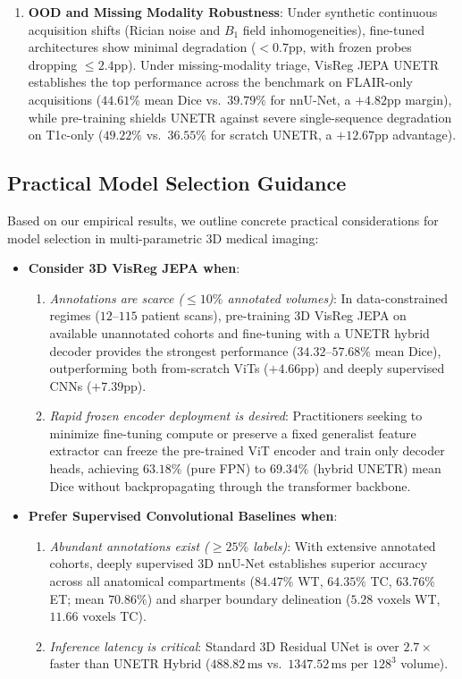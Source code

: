 \documentclass{article}
\begin{document}
\begin{enumerate}
\begin{itemize}
    \end{itemize}
    \item \textbf{OOD and Missing Modality Robustness}: Under synthetic continuous acquisition shifts (Rician noise and $B_1$ field inhomogeneities), fine-tuned architectures show minimal degradation ($< 0.7\text{pp}$, with frozen probes dropping $\le 2.4\text{pp}$). Under missing-modality triage, VisReg JEPA UNETR establishes the top performance across the benchmark on FLAIR-only acquisitions ($\mathbf{44.61\%}$ mean Dice vs.\ $39.79\%$ for nnU-Net, a $+4.82\text{pp}$ margin), while pre-training shields UNETR against severe single-sequence degradation on T1c-only ($49.22\%$ vs.\ $36.55\%$ for scratch UNETR, a $+12.67\text{pp}$ advantage).
\end{enumerate}

\subsection{Practical Model Selection Guidance}
\label{sec:practical_guidance}

Based on our empirical results, we outline concrete practical considerations for model selection in multi-parametric 3D medical imaging:
\begin{itemize}
    \item \textbf{Consider 3D VisReg JEPA when}:
    \begin{enumerate}
        \item \emph{Annotations are scarce ($\le 10\%$ annotated volumes)}: In data-constrained regimes ($12\text{--}115$ patient scans), pre-training 3D VisReg JEPA on available unannotated cohorts and fine-tuning with a UNETR hybrid decoder provides the strongest performance ($34.32\text{--}57.68\%$ mean Dice), outperforming both from-scratch ViTs ($+4.66\text{pp}$) and deeply supervised CNNs ($+7.39\text{pp}$).
        \item \emph{Rapid frozen encoder deployment is desired}: Practitioners seeking to minimize fine-tuning compute or preserve a fixed generalist feature extractor can freeze the pre-trained ViT encoder and train only decoder heads, achieving $63.18\%$ (pure FPN) to $69.34\%$ (hybrid UNETR) mean Dice without backpropagating through the transformer backbone.
    \end{enumerate}
    \item \textbf{Prefer Supervised Convolutional Baselines when}:
    \begin{enumerate}
        \item \emph{Abundant annotations exist ($\ge 25\%$ labels)}: With extensive annotated cohorts, deeply supervised 3D nnU-Net establishes superior accuracy across all anatomical compartments ($84.47\%$ WT, $64.35\%$ TC, $63.76\%$ ET; mean $70.86\%$) and sharper boundary delineation ($5.28\text{ voxels}$ WT, $11.66\text{ voxels}$ TC).
        \item \emph{Inference latency is critical}: Standard 3D Residual UNet is over $2.7\times$ faster than UNETR Hybrid ($488.82\,\text{ms}$ vs.\ $1347.52\,\text{ms}$ per $128^3$ volume).
    \end{enumerate}
\end{itemize}
\end{document}
